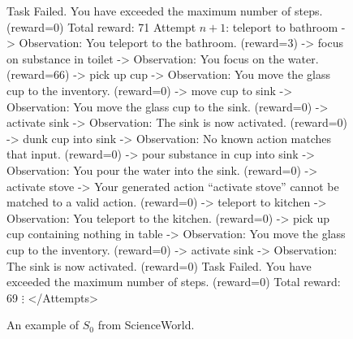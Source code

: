 \documentclass{article}
\newcommand{\0}{\mathbf{0}}
\begin{document}
\begin{figure}[H]
\begin{tcolorbox}[
      colback=gray!5!white,
      colframe=black!100!black,
      width=1\textwidth
  ]
Task Failed. You have exceeded the maximum number of steps. (reward=0) Total reward: 71
\vspace{.25cm}
Attempt $n+1$:
teleport to bathroom -> Observation: You teleport to the bathroom. (reward=3)
-> focus on substance in toilet -> Observation: You focus on the water. (reward=66)
-> pick up cup -> Observation: You move the glass cup to the inventory. (reward=0)
-> move cup to sink -> Observation: You move the glass cup to the sink. (reward=0)
-> activate sink -> Observation: The sink is now activated. (reward=0)
-> dunk cup into sink -> Observation: No known action matches that input. (reward=0)
-> pour substance in cup into sink -> Observation: You pour the water into the sink. (reward=0)
-> activate stove -> Your generated action ``activate stove'' cannot be matched to a valid action. (reward=0)
-> teleport to kitchen -> Observation: You teleport to the kitchen. (reward=0)
-> pick up cup containing nothing in table -> Observation: You move the glass cup to the inventory. (reward=0)
-> activate sink -> Observation: The sink is now activated. (reward=0)
Task Failed. You have exceeded the maximum number of steps. (reward=0) Total reward: 69
\vspace{.25cm}
$\vdots$
\vspace{.25cm}
</Attempts>
  \end{tcolorbox}
  \caption{An example of $S_0$ from ScienceWorld. }
  \label{fig:s_task_sciworld}
\end{figure}
\end{document}
